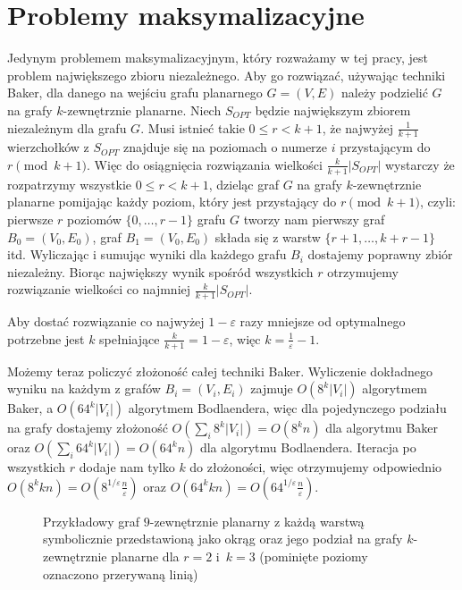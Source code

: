 \documentclass[twoside,a4paper,12pt]{report} %
\theoremstyle{break}
\begin{document}
\section{Problemy maksymalizacyjne}
Jedynym problemem maksymalizacyjnym, który rozważamy w tej pracy, jest problem największego zbioru niezależnego. Aby go rozwiązać, używając techniki Baker, dla danego na wejściu grafu planarnego $G=(V,E)$ należy podzielić $G$ na grafy $k$-zewnętrznie planarne. Niech $S_{OPT}$ będzie największym zbiorem niezależnym dla grafu $G$. Musi istnieć takie $0 \le r < k+1$, że najwyżej $\frac{1}{k+1}$ wierzchołków z $S_{OPT}$ znajduje się na poziomach o numerze $i$ przystającym do $r \pmod{k+1}$. Więc do osiągnięcia rozwiązania wielkości $\frac{k}{k+1}|S_{OPT}|$ wystarczy że rozpatrzymy wszystkie $0 \le r < k+1$, dzieląc graf $G$ na grafy $k$-zewnętrznie planarne pomijając każdy poziom, który jest przystający do $r \pmod{k+1}$, czyli: pierwsze $r$ poziomów $\{0,\dots,r-1\}$ grafu $G$ tworzy nam pierwszy graf $B_0=(V_0,E_0)$, graf $B_1=(V_0,E_0)$ składa się z warstw $\{r+1,\dots,k+r-1\}$ itd. Wyliczając i sumując wyniki dla każdego grafu $B_i$ dostajemy poprawny zbiór niezależny. Biorąc największy wynik spośród wszystkich $r$ otrzymujemy rozwiązanie wielkości co najmniej  $\frac{k}{k+1}|S_{OPT}|$.

Aby dostać rozwiązanie co  najwyżej $1-\varepsilon$ razy mniejsze od optymalnego potrzebne jest $k$ spełniające $\frac{k}{k+1}=1-\varepsilon$, więc $k=\frac{1}{\varepsilon}-1$.

Możemy teraz policzyć złożoność całej techniki Baker. Wyliczenie dokładnego wyniku na każdym z grafów $B_i=(V_i, E_i)$ zajmuje $O(8^k|V_i|)$ algorytmem Baker, a $O(64^k|V_i|)$ algorytmem Bodlaendera, więc dla pojedynczego podziału na grafy dostajemy złożoność $O(\sum_i 8^k|V_i|)=O(8^kn)$ dla algorytmu Baker oraz $O(\sum_i 64^k|V_i|)=O(64^kn)$ dla algorytmu Bodlaendera. Iteracja po wszystkich $r$ dodaje nam tylko $k$ do złożoności, więc otrzymujemy odpowiednio $O(8^kkn)=O(8^{1/\varepsilon}\frac{n}{\varepsilon})$ oraz $O(64^kkn)=O(64^{1/\varepsilon}\frac{n}{\varepsilon})$.

\begin{figure}[ht]
    \centering
    
    \caption{Przykładowy graf $9$-zewnętrznie planarny z każdą warstwą symbolicznie przedstawioną jako okrąg oraz jego podział na grafy $k$-zewnętrznie planarne dla $r=2$ i~$k=3$ (pominięte poziomy oznaczono przerywaną linią)}
    \label{max_problem}
\end{figure}
\end{document}
